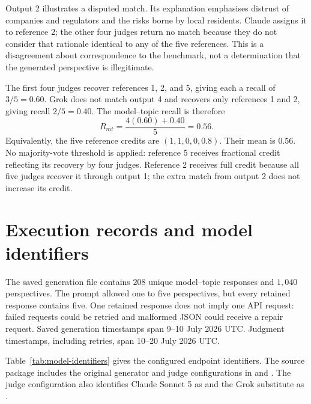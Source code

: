 \documentclass[11pt,a4paper]{article}
\begin{document}
Output 2 illustrates a disputed match. Its explanation emphasises distrust of companies and regulators and the risks borne by local residents. Claude assigns it to reference 2; the other four judges return no match because they do not consider that rationale identical to any of the five references. This is a disagreement about correspondence to the benchmark, not a determination that the generated perspective is illegitimate.

The first four judges recover references 1, 2, and 5, giving each a recall of $3/5=0.60$. Grok does not match output 4 and recovers only references 1 and 2, giving recall $2/5=0.40$. The model--topic recall is therefore
\[
R_{mt}=\frac{4(0.60)+0.40}{5}=0.56.
\]
Equivalently, the five reference credits are $(1,1,0,0,0.8)$. Their mean is $0.56$. No majority-vote threshold is applied: reference 5 receives fractional credit reflecting its recovery by four judges. Reference 2 receives full credit because all five judges recover it through output 1; the extra match from output 2 does not increase its credit.




\section{Execution records and model identifiers}
\label{app:execution}
The saved generation file contains $208$ unique model--topic responses and $1{,}040$ perspectives. The prompt allowed one to five perspectives, but every retained response contains five. One retained response does not imply one API request: failed requests could be retried and malformed JSON could receive a repair request. Saved generation timestamps span 9--10 July 2026 UTC. Judgment timestamps, including retries, span 10--20 July 2026 UTC.

Table~\ref{tab:model-identifiers} gives the configured endpoint identifiers. The source package includes the original generator and judge configurations in  and . The judge configuration also identifies Claude Sonnet 5 as  and the Grok substitute as .
\end{document}
